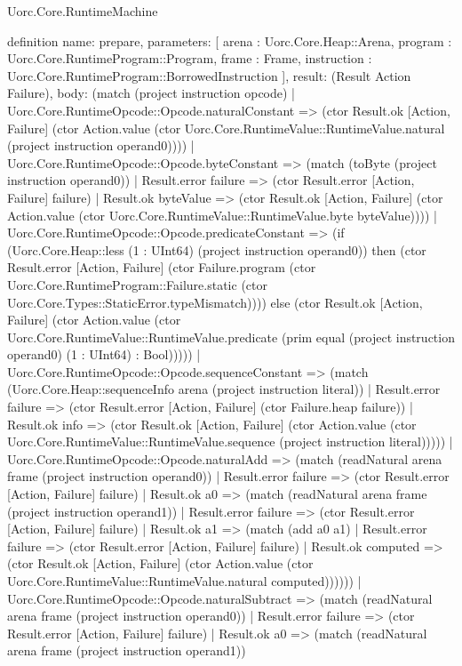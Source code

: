 \begin{lexlean}{Uorc.Core.RuntimeMachine}
\begin{semanticmodule}
definition{
  name: prepare,
  parameters: [
    arena : Uorc.Core.Heap::Arena,
    program : Uorc.Core.RuntimeProgram::Program,
    frame : Frame,
    instruction : Uorc.Core.RuntimeProgram::BorrowedInstruction
  ],
  result: (Result Action Failure),
  body: (match (project instruction opcode)
    | Uorc.Core.RuntimeOpcode::Opcode.naturalConstant => (ctor Result.ok [Action, Failure] (ctor Action.value (ctor Uorc.Core.RuntimeValue::RuntimeValue.natural (project instruction operand0))))
    | Uorc.Core.RuntimeOpcode::Opcode.byteConstant => (match (toByte (project instruction operand0))
      | Result.error failure => (ctor Result.error [Action, Failure] failure)
      | Result.ok byteValue => (ctor Result.ok [Action, Failure] (ctor Action.value (ctor Uorc.Core.RuntimeValue::RuntimeValue.byte byteValue))))
    | Uorc.Core.RuntimeOpcode::Opcode.predicateConstant => (if (Uorc.Core.Heap::less (1 : UInt64) (project instruction operand0)) then (ctor Result.error [Action, Failure] (ctor Failure.program (ctor Uorc.Core.RuntimeProgram::Failure.static (ctor Uorc.Core.Types::StaticError.typeMismatch)))) else (ctor Result.ok [Action, Failure] (ctor Action.value (ctor Uorc.Core.RuntimeValue::RuntimeValue.predicate (prim equal (project instruction operand0) (1 : UInt64) : Bool)))))
    | Uorc.Core.RuntimeOpcode::Opcode.sequenceConstant => (match (Uorc.Core.Heap::sequenceInfo arena (project instruction literal))
      | Result.error failure => (ctor Result.error [Action, Failure] (ctor Failure.heap failure))
      | Result.ok info => (ctor Result.ok [Action, Failure] (ctor Action.value (ctor Uorc.Core.RuntimeValue::RuntimeValue.sequence (project instruction literal)))))
    | Uorc.Core.RuntimeOpcode::Opcode.naturalAdd => (match (readNatural arena frame (project instruction operand0))
      | Result.error failure => (ctor Result.error [Action, Failure] failure)
      | Result.ok a0 => (match (readNatural arena frame (project instruction operand1))
        | Result.error failure => (ctor Result.error [Action, Failure] failure)
        | Result.ok a1 => (match (add a0 a1)
          | Result.error failure => (ctor Result.error [Action, Failure] failure)
          | Result.ok computed => (ctor Result.ok [Action, Failure] (ctor Action.value (ctor Uorc.Core.RuntimeValue::RuntimeValue.natural computed))))))
    | Uorc.Core.RuntimeOpcode::Opcode.naturalSubtract => (match (readNatural arena frame (project instruction operand0))
      | Result.error failure => (ctor Result.error [Action, Failure] failure)
      | Result.ok a0 => (match (readNatural arena frame (project instruction operand1))
}
\end{semanticmodule}
\end{lexlean}
